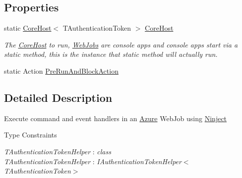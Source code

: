 \subsection*{Properties}
\begin{DoxyCompactItemize}
\item 
static \hyperlink{classCqrs_1_1Hosts_1_1CoreHost}{Core\+Host}$<$ T\+Authentication\+Token $>$ \hyperlink{classCqrs_1_1Ninject_1_1Azure_1_1WebJobs_1_1CqrsNinjectJobHost_a2c166839548b7c238a9462b46bd8e555_a2c166839548b7c238a9462b46bd8e555}{Core\+Host}
\begin{DoxyCompactList}\small\item\em The \hyperlink{classCqrs_1_1Ninject_1_1Azure_1_1WebJobs_1_1CqrsNinjectJobHost_a2c166839548b7c238a9462b46bd8e555_a2c166839548b7c238a9462b46bd8e555}{Core\+Host} to run, \hyperlink{namespaceCqrs_1_1Ninject_1_1Azure_1_1WebJobs}{Web\+Jobs} are console apps and console apps start via a static method, this is the instance that static method will actually run. \end{DoxyCompactList}\item 
static Action \hyperlink{classCqrs_1_1Ninject_1_1Azure_1_1WebJobs_1_1CqrsNinjectJobHost_a16eceaa51739d5baff6e4986ed822d8f_a16eceaa51739d5baff6e4986ed822d8f}{Pre\+Run\+And\+Block\+Action}
\end{DoxyCompactItemize}


\subsection{Detailed Description}
Execute command and event handlers in an \hyperlink{namespaceCqrs_1_1Ninject_1_1Azure}{Azure} Web\+Job using \hyperlink{namespaceCqrs_1_1Ninject}{Ninject} 

\begin{Desc}
\item[Type Constraints]\begin{description}
\item[{\em T\+Authentication\+Token\+Helper} : {\em class}]\item[{\em T\+Authentication\+Token\+Helper} : {\em I\+Authentication\+Token\+Helper$<$T\+Authentication\+Token$>$}]\end{description}
\end{Desc}


